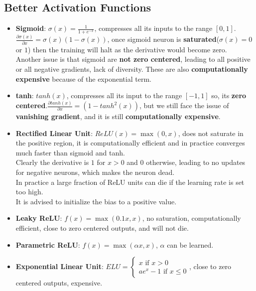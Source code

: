 \documentclass[a4paper]{article}
\begin{document}
\subsection{Better Activation Functions}
\begin{itemize}
    \item \textbf{Sigmoid}: $\sigma(x)=\frac{1}{1+e^{-x}}$, compresses all its inputs to the range $[0,1]$. $\frac{\partial \sigma(x)}{\partial x}=\sigma(x)(1-\sigma(x))$, once sigmoid neuron is \textbf{saturated}($\sigma(x)=0$ or $1$) then the training will halt as the derivative would become zero.\\
    Another issue is that sigmoid are \textbf{not zero centered}, leading to all positive or all negative gradients, lack of diversity. These are also \textbf{computationally expensive} because of the exponential term.
    \item \textbf{tanh}: $tanh(x)$, compresses all its input to the range $[-1,1]$ so, its \textbf{zero centered}.$\frac{\partial tanh(x)}{\partial x}=(1-tanh^2(x))$, but we still face the issue of \textbf{vanishing gradient}, and it is still \textbf{computationally expensive}.
    \item \textbf{Rectified Linear Unit}: $ReLU(x)=\max{(0,x)}$, does not saturate in the positive region, it is computationally efficient and in practice converges much faster than sigmoid and tanh.\\
    Clearly the derivative is $1$ for $x>0$ and $0$ otherwise, leading to no updates for negative neurons, which makes the neuron dead.\\
    In practice a large fraction of ReLU units can die if the learning rate is set too high.\\
    It is advised to initialize the bias to a positive value.
    \item \textbf{Leaky ReLU}: $f(x)=\max{(0.1x,x)}$, no saturation, computationally efficient, close to zero centered outputs, and will not die.
    \item \textbf{Parametric ReLU}: $f(x)=\max{(\alpha x,x)}$, $\alpha$ can be learned.
    \item \textbf{Exponential Linear Unit}: $ELU=\begin{cases}
        x\text{ if }x>0\\ ae^x-1\text{ if }x\leq 0
    \end{cases}$, close to zero centered outputs, expensive.
    \begin{figure}[H]
        \centering
        \begin{subfigure}[b]{0.3\textwidth}

\end{subfigure}
\end{figure}
\end{itemize}
\end{document}
